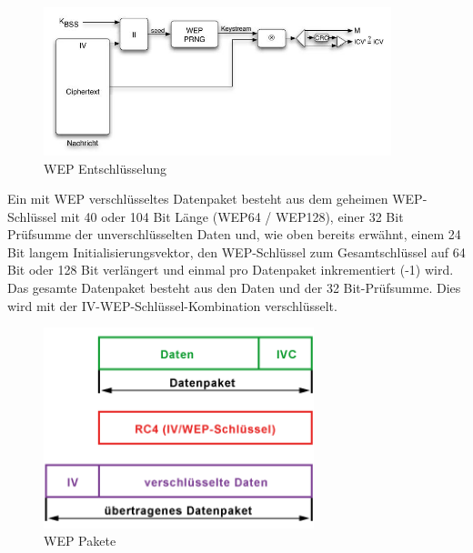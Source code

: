 	\begin{figure}[H]
		\centering
		\includegraphics[width=0.9\textwidth]{images/WLAN/WEPDekodierung.JPG}
		\caption{WEP Entschlüsselung}
		\label{fig:WEP Entschlüsselung}
	\end{figure}

	\noindent Ein mit WEP verschlüsseltes Datenpaket besteht aus dem geheimen WEP-Schlüssel mit 40 oder 104 Bit Länge (WEP64 / WEP128), einer 32 Bit Prüfsumme der unverschlüsselten
	Daten und, wie oben bereits erwähnt, einem 24 Bit langem Initialisierungsvektor, den WEP-Schlüssel zum Gesamtschlüssel auf 64 Bit oder 128 Bit verlängert und einmal pro
	Datenpaket inkrementiert (-1) wird. \\
	Das gesamte Datenpaket besteht aus den Daten und der 32 Bit-Prüfsumme. Dies wird
	mit der IV-WEP-Schlüssel-Kombination verschlüsselt.

			\begin{figure}[H]
				\centering
				\includegraphics[width=0.7\textwidth]{images/WLAN/WEPpakete.png}
				\caption{WEP Pakete}
				\label{fig:WEP Pakete}
			\end{figure}


